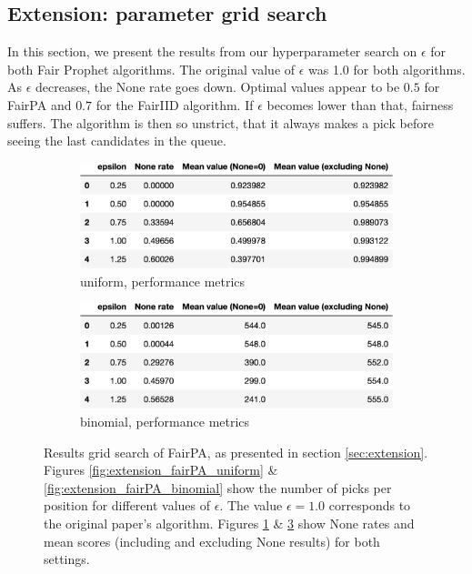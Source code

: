 \newpage
\subsection{Extension: parameter grid search}
\label{sec:parameter_extension}

In this section, we present the results from our hyperparameter search on $\epsilon$ for both Fair Prophet algorithms. The original value of $\epsilon$ was 1.0 for both algorithms. As $\epsilon$ decreases, the None rate goes down. Optimal values appear to be $0.5$ for FairPA and $0.7$ for the FairIID algorithm. If $\epsilon$ becomes lower than that, fairness suffers. The algorithm is then so unstrict, that it always makes a pick before seeing the last candidates in the queue.


\begin{figure}[ht]

  \begin{subfigure}[t]{.5\textwidth}
    \centering
    \includegraphics[width=\linewidth]{Images/extension/FairGeneralProphet_uniform_table.jpeg}
    \caption{uniform, performance metrics}
    \label{fig:extension_fairPA_uniform_table}
  \end{subfigure}
  \hfill
  \begin{subfigure}[t]{.5\textwidth}
    \centering
    \includegraphics[width=\linewidth]{Images/extension/FairGeneralProphet_binomial_table.jpeg}
    \caption{binomial, performance metrics}
    \label{fig:extension_fairPA_binomial_table}
  \end{subfigure}

  \caption{
    Results grid search of FairPA, as presented in section \ref{sec:extension}. Figures \ref{fig:extension_fairPA_uniform} \& \ref{fig:extension_fairPA_binomial} show the number of picks per position for different values of $\epsilon$. The value $\epsilon = 1.0$ corresponds to the original paper's algorithm. Figures \ref{fig:extension_fairPA_uniform_table} \& \ref{fig:extension_fairPA_binomial_table} show None rates and mean scores (including and excluding None results) for both settings.
    }
\end{figure}



